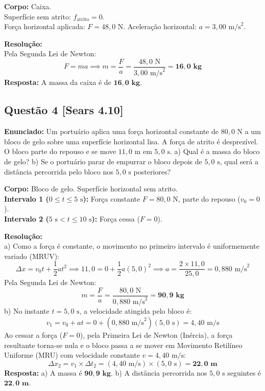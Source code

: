 \documentclass[11pt,a4paper]{article}
\begin{document}
\begin{dclbox}
\textbf{Corpo:} Caixa.\\
Superfície sem atrito: $f_{\text{atrito}} = 0$.\\
Força horizontal aplicada: $F = 48,0\text{ N}$. Aceleração horizontal: $a = 3,00\text{ m/s}^2$.
\end{dclbox}

\noindent
\textbf{Resolução:}\\
Pela Segunda Lei de Newton:
\[ F = m a \implies m = \frac{F}{a} = \frac{48,0\text{ N}}{3,00\text{ m/s}^2} = \mathbf{16,0\text{ kg}} \]
\textbf{Resposta:} A massa da caixa é de $\mathbf{16,0\text{ kg}}$.

\vspace{0.3cm}
\subsection*{Questão 4 [Sears 4.10]}
\textbf{Enunciado:} Um portuário aplica uma força horizontal constante de $80,0\text{ N}$ a um bloco de gelo sobre uma superfície horizontal lisa. A força de atrito é desprezível. O bloco parte do repouso e se move $11,0\text{ m}$ em $5,0\text{ s}$. a) Qual é a massa do bloco de gelo? b) Se o portuário parar de empurrar o bloco depois de $5,0\text{ s}$, qual será a distância percorrida pelo bloco nos $5,0\text{ s}$ posteriores?

\begin{dclbox}
\textbf{Corpo:} Bloco de gelo. Superfície horizontal sem atrito.\\
\textbf{Intervalo 1 ($0 \le t \le 5\text{ s}$):} Força constante $F = 80,0\text{ N}$, parte do repouso ($v_0 = 0$).\\
\textbf{Intervalo 2 ($5\text{ s} < t \le 10\text{ s}$):} Força cessa ($F = 0$).
\end{dclbox}

\noindent
\textbf{Resolução:}\\
a) Como a força é constante, o movimento no primeiro intervalo é uniformemente variado (MRUV):
\[ \Delta x = v_0 t + \frac{1}{2} a t^2 \implies 11,0 = 0 + \frac{1}{2} a (5,0)^2 \implies a = \frac{2 \times 11,0}{25,0} = 0,880\text{ m/s}^2 \]
Pela Segunda Lei de Newton:
\[ m = \frac{F}{a} = \frac{80,0\text{ N}}{0,880\text{ m/s}^2} = \mathbf{90,9\text{ kg}} \]
b) No instante $t = 5,0\text{ s}$, a velocidade atingida pelo bloco é:
\[ v_1 = v_0 + a t = 0 + (0,880\text{ m/s}^2)(5,0\text{ s}) = 4,40\text{ m/s} \]
Ao cessar a força ($F = 0$), pela Primeira Lei de Newton (Inércia), a força resultante torna-se nula e o bloco passa a se mover em Movimento Retilíneo Uniforme (MRU) com velocidade constante $v = 4,40\text{ m/s}$:
\[ \Delta x_2 = v_1 \times \Delta t_2 = (4,40\text{ m/s}) \times (5,0\text{ s}) = \mathbf{22,0\text{ m}} \]
\textbf{Resposta:} a) A massa é $\mathbf{90,9\text{ kg}}$. b) A distância percorrida nos $5,0\text{ s}$ seguintes é $\mathbf{22,0\text{ m}}$.
\end{document}
